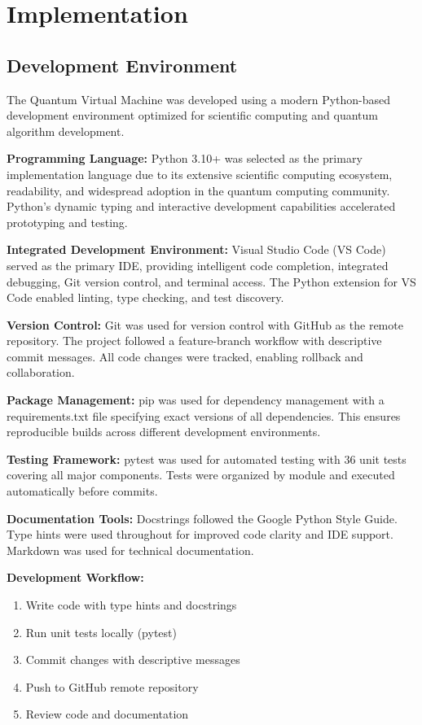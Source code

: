 \chapter{Implementation}

\section{Development Environment}
The Quantum Virtual Machine was developed using a modern Python-based development environment optimized for scientific computing and quantum algorithm development.

\textbf{Programming Language:} Python 3.10+ was selected as the primary implementation language due to its extensive scientific computing ecosystem, readability, and widespread adoption in the quantum computing community. Python's dynamic typing and interactive development capabilities accelerated prototyping and testing.

\textbf{Integrated Development Environment:} Visual Studio Code (VS Code) served as the primary IDE, providing intelligent code completion, integrated debugging, Git version control, and terminal access. The Python extension for VS Code enabled linting, type checking, and test discovery.

\textbf{Version Control:} Git was used for version control with GitHub as the remote repository. The project followed a feature-branch workflow with descriptive commit messages. All code changes were tracked, enabling rollback and collaboration.

\textbf{Package Management:} pip was used for dependency management with a requirements.txt file specifying exact versions of all dependencies. This ensures reproducible builds across different development environments.

\textbf{Testing Framework:} pytest was used for automated testing with 36 unit tests covering all major components. Tests were organized by module and executed automatically before commits.

\textbf{Documentation Tools:} Docstrings followed the Google Python Style Guide. Type hints were used throughout for improved code clarity and IDE support. Markdown was used for technical documentation.

\textbf{Development Workflow:}
\begin{enumerate}
\item Write code with type hints and docstrings
\item Run unit tests locally (pytest)
\item Commit changes with descriptive messages
\item Push to GitHub remote repository
\item Review code and documentation
\end{enumerate}

